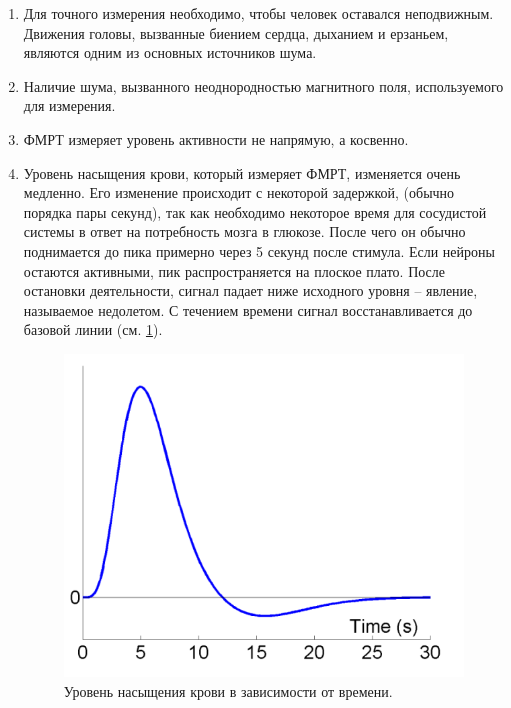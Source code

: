 \documentclass[pdftex,ptm,12pt,a4paper]{report}
\theoremstyle{definition}
\begin{document}
\begin{enumerate}
\item Для точного измерения необходимо, чтобы человек оставался неподвижным. Движения головы, вызванные биением сердца, дыханием и  ерзаньем, являются одним из основных источников шума.

\item Наличие шума, вызванного неоднородностью магнитного поля, используемого для измерения.

\item ФМРТ измеряет уровень активности не напрямую, а косвенно.

\item Уровень насыщения крови, который измеряет ФМРТ, изменяется очень медленно. Его изменение происходит с некоторой задержкой, (обычно порядка пары секунд), так как необходимо некоторое время для сосудистой системы в ответ на потребность мозга в глюкозе. После чего он обычно поднимается до пика примерно через 5 секунд после стимула. Если нейроны остаются активными, пик распространяется на плоское плато. После остановки деятельности, сигнал падает ниже исходного уровня -- явление, называемое недолетом. С течением времени сигнал восстанавливается до базовой линии (см. \ref{hrf}). 

\begin{figure}[h]
\includegraphics[scale=0.4]{images/hrf.png}
\centering
\caption{Уровень насыщения крови в зависимости от времени.}
\label{hrf}
\end{figure}

\end{enumerate}
\end{document}
